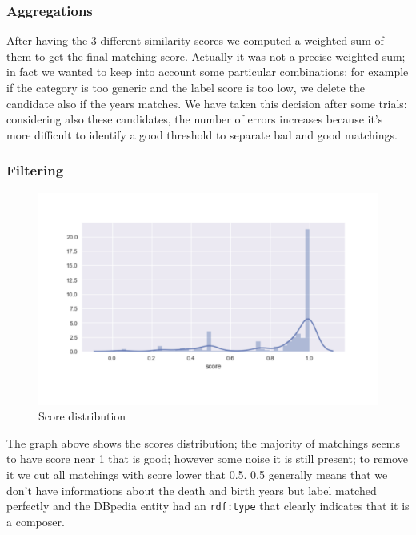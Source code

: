 \documentclass[paper=a4, fontsize=11pt]{scrartcl}
\begin{document}
\begin{enumerate}
\end{enumerate}

\subsubsection{Aggregations}

After having the 3 different similarity scores we computed a weighted sum of them  to get the final matching score. Actually it was not a precise weighted sum; in fact we wanted to keep into account some particular combinations; for example if the category is too generic and the label score is too low, we delete the candidate also if the years matches. We have taken this decision after some trials: considering also these candidates, the number of errors increases because it's more difficult to identify a good threshold to separate bad and good matchings.

\subsubsection{Filtering}

\begin{figure}[!htb]
  \centering
    \includegraphics[width=1\textwidth]{images/score_distribution.jpg}
    \caption{Score distribution}
\end{figure}

The graph above shows the scores distribution; the majority of matchings seems to have score near 1 that is good; however some noise it is still present; to remove it we cut all matchings with score lower that 0.5. 0.5 generally means that we don't have informations about the death and birth years but label matched perfectly and the DBpedia entity had an \verb|rdf:type| that clearly indicates that it is a composer.
\end{document}

